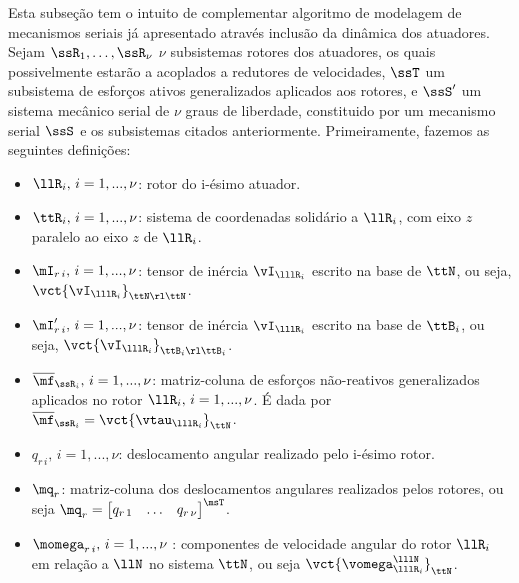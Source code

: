 \documentclass[]{politex}
\begin{document}
Esta subseção tem o intuito de complementar algoritmo de modelagem de mecanismos seriais já apresentado através inclusão da dinâmica dos atuadores. \\ 

Sejam $\ssR_1,\hdots,\ssR_\nu$ $\nu$ subsistemas rotores dos atuadores, os quais possivelmente estarão a acoplados a redutores de velocidades, $\ssT$ um subsistema de esforços ativos generalizados aplicados aos rotores,  e $\ssS'$ um sistema mecânico serial de $\nu$ graus de liberdade, constituido por um mecanismo serial $\ssS$ e os subsistemas citados anteriormente. Primeiramente, fazemos as seguintes definições:

\begin{itemize}
\item $\llR_i, \,i=1,...,\nu$: rotor do i-ésimo atuador.
\item $\ttR_i, \,i=1,...,\nu$: sistema de coordenadas solidário a $\llR_i$, com eixo $z$ paralelo ao eixo $z$ de $\llR_i$.
\item $\mI_{r \,i}, \,i=1,...,\nu$: tensor de in\'ercia $\vI_{\lllR_i}$ escrito na base de $\ttN$, ou seja, $\vct{\vI_{\lllR_i}}_{\ttN \rl \ttN}$.
\item $\mI'_{r \,i}, \,i=1,...,\nu$: tensor de in\'ercia $\vI_{\lllR_i}$ escrito na base de $\ttB_i$, ou seja, $\vct{\vI_{\lllR_i}}_{\ttB_i \rl \ttB_i}$.
\item $\overline{\mf}_{\ssR_i}, \,i=1,...,\nu$: matriz-coluna de esforços não-reativos generalizados aplicados no rotor $\llR_{i}, \,i=1,...,\nu$. É dada por $\overline{\mf}_{\ssR_i} = \vct{\vtau_{\lllR_i}}_\ttN $.
\item $q_{r\,i}, \,i=1,...,\nu$: deslocamento angular realizado pelo i-ésimo rotor.
\item $\mq_r$: matriz-coluna dos deslocamentos angulares realizados pelos rotores, ou seja $\mq_r = \begin{bmatrix} q_{r\,1} & \hdots & q_{r\,\nu}  \end{bmatrix}^\msT$.
\item $\momega_{r \,i}, \,i=1,...,\nu$ : componentes de velocidade angular do rotor $\llR_i$ em relação a $\llN$ no sistema $\ttN$, ou seja $\vct{\vomega_{\lllR_i}^{\lllN} }_{\ttN} $.

\end{itemize}
\end{document}
